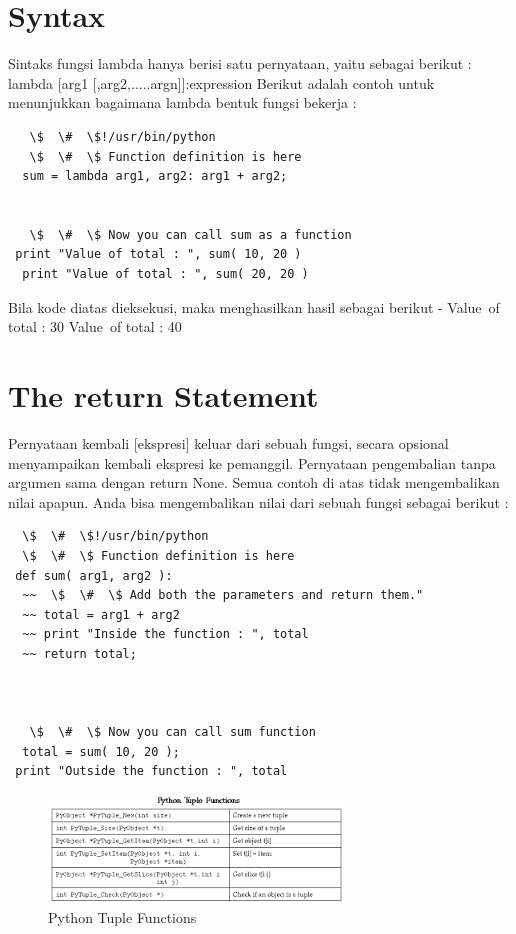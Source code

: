 \section{Syntax} 
Sintaks fungsi lambda hanya berisi satu pernyataan, yaitu sebagai berikut : 
  lambda [arg1 [,arg2,.....argn]]:expression 
Berikut adalah contoh untuk menunjukkan bagaimana lambda bentuk fungsi bekerja :
\begin{verbatim}
   \$  \#  \$!/usr/bin/python 
   \$  \#  \$ Function definition is here 
  sum = lambda arg1, arg2: arg1 + arg2;


   \$  \#  \$ Now you can call sum as a function 
 print "Value of total : ", sum( 10, 20 ) 
  print "Value of total : ", sum( 20, 20 ) 
  \end{verbatim}
Bila kode diatas dieksekusi, maka menghasilkan hasil sebagai berikut - 
 Value~of total :  30 
 Value~of total :  40 
\section{The return Statement} 
Pernyataan kembali [ekspresi] keluar dari sebuah fungsi, secara opsional menyampaikan kembali ekspresi ke pemanggil. Pernyataan pengembalian tanpa argumen sama dengan return None. 
Semua contoh di atas tidak mengembalikan nilai apapun. Anda bisa mengembalikan nilai dari sebuah fungsi sebagai berikut :
\begin{verbatim}
  \$  \#  \$!/usr/bin/python 
  \$  \#  \$ Function definition is here 
 def sum( arg1, arg2 ): 
  ~~  \$  \#  \$ Add both the parameters and return them." 
  ~~ total = arg1 + arg2 
  ~~ print "Inside the function : ", total 
  ~~ return total; 
 


   \$  \#  \$ Now you can call sum function 
  total = sum( 10, 20 ); 
 print "Outside the function : ", total  
 \end{verbatim}
  \begin{figure}[ht]
 	\centerline{\includegraphics[width=0.70\textwidth]{figures/Functions1}}
 	\caption{Python Tuple Functions}
 	\label{Python Tuple Functions}
 \end{figure} 
 
